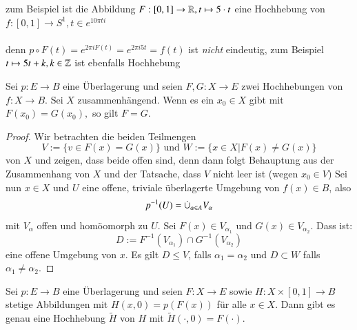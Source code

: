 \documentclass[a4paper,10pt]{scrartcl}
\begin{document}
zum Beispiel ist die Abbildung $F:[0,1]\to \mathbb{R}, t\mapsto  5 \cdot t$ eine Hochhebung von $f: [0,1]\to S^1, t \in e^{10\pi t i}$\\
\fixme[fig73]\\
denn $p\circ F(t)=e^{2\pi i F(t)}=e^{2\pi i 5 t}=f(t)$ ist \emph{nicht} eindeutig, zum Beispiel 
$t\mapsto 5t+k, k\in \mathbb{Z}$ ist ebenfalls Hochhebung
\begin{st}\label{thm2:2.3}
Sei $p: E \to B$ eine Überlagerung und seien $F,G: X\to E$ zwei Hochhebungen von $f:X\to B$. Sei $X$ zusammenhängend. Wenn es ein $x_0 \in X$ gibt mit $F(x_0)=G(x_0),$ so gilt $F=G$. 
\end{st}
\begin{proof}
 Wir betrachten die beiden Teilmengen
\[
 V:=\{v\in F(x)=G(x)\} \text{ und } W:=\{x\in X|F(x)\neq G(x)\}
\]
von $X$ und zeigen, dass beide offen sind, denn dann folgt Behauptung aus der Zusammenhang von $X$ und der Tatsache, dass $V$ nicht leer ist (wegen $x_0\in V$) Sei nun $x\in X$ und $U$ eine offene, triviale überlagerte Umgebung von $f(x)\in B$, also
\[
 p^{-1}(U)=\mathbin{\dot{\cup}}_{\alpha\in A} V_\alpha
\]
mit $V_\alpha$ offen und homöomorph zu $U$. Sei $F(x)\in V_{\alpha_1}$ und $G(x)\in V_{\alpha_2}$. Dass ist:
\[
 D:=F^{-1}(V_{\alpha_1})\cap G^{-1}(V_{\alpha_2})
\]
eine offene Umgebung von $x$. Es gilt $D\le V$, falls $\alpha_1=\alpha_2$ und $D\subset W$ falls $\alpha_1\neq \alpha_2$.
\end{proof}
\begin{st} \label{thm:2.4}
 Sei $p: E\to B$ eine Überlagerung und seien $F: X \to E$ sowie $H: X\times [0,1] \to B$ stetige Abbildungen mit $H(x,0)=p(F(x))$ für alle $x\in X$. Dann gibt es genau eine Hochhebung $\tilde H$ von $H$ mit $\tilde H(\cdot, 0)=F(\cdot)$.
\end{st}
\end{document}
